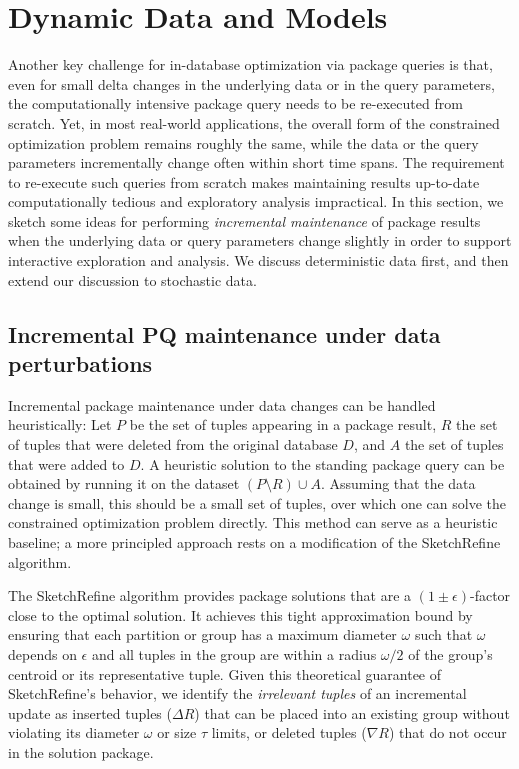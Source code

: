 \documentclass[11pt]{article}
\newcommand{\skref}{{\sc SketchRefine}\xspace}
\begin{document}
    
\section{Dynamic Data and Models} 
    \label{sub:changing_data_and_models}
    
Another key challenge for in-database optimization via package queries is that,
even for small delta changes in the underlying data or in the query parameters,
the computationally intensive package query needs to be re-executed from
scratch. Yet, in most real-world applications, the overall form of the
constrained optimization problem remains roughly the same, while the data or
the query parameters incrementally change often within short time spans. The
requirement to re-execute such queries from scratch makes maintaining results
up-to-date computationally tedious and exploratory analysis impractical. In
this section, we sketch some ideas for performing \emph{incremental maintenance}
of package results when the underlying data or query parameters change slightly
in order to support interactive exploration and analysis. We discuss
deterministic data first, and then extend our discussion to stochastic data.

\subsection{Incremental PQ maintenance under data perturbations}
\label{sec:deltaData}

Incremental package maintenance under data changes can be handled heuristically: Let $P$ be the set of tuples appearing in a package result, $R$ the set of tuples that were deleted from the original database $D$, and $A$ the set of tuples that were added to $D$. A heuristic solution to the standing package query can be obtained by running it on the dataset $(P\setminus R)\cup A$.  Assuming that the data change is small, this should be a small set of tuples, over which one can solve the constrained optimization problem directly. This method can serve as a heuristic baseline; a more principled approach rests on a modification of the \skref algorithm.

The \skref algorithm provides package solutions that are a $(1\pm\epsilon)$-factor close to the optimal solution. It achieves this tight approximation bound by ensuring that each partition or group has a maximum diameter $\omega$ such that $\omega$ depends on $\epsilon$ and all tuples in the group are within a radius $\omega/2$ of the group's centroid or its representative tuple. Given this theoretical guarantee of \skref's behavior, we identify the \textit{irrelevant tuples} of an incremental update as inserted tuples  ($\Delta R$) that can be placed into an existing group without violating its diameter $\omega$ or size $\tau$ limits, or deleted tuples ($\nabla R$) that do not occur in the solution package. 
\end{document}
